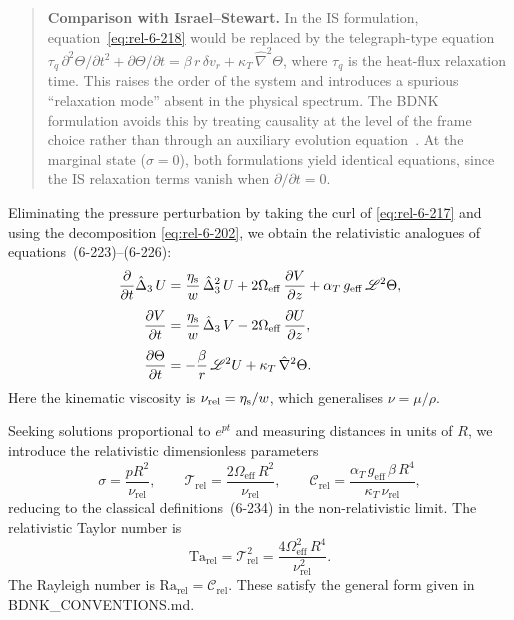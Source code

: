 \begin{quote}
\textbf{Comparison with Israel--Stewart.}
In the IS formulation, equation~\eqref{eq:rel-6-218} would be replaced
by the telegraph-type equation
$\tau_{q}\,\partial^{2}\Theta/\partial t^{2}
+ \partial\Theta/\partial t
= \beta\,r\,\delta v_{r} + \kappa_{T}\,\hat{\nabla}^{2}\Theta$,
where $\tau_{q}$ is the heat-flux relaxation time.  This raises the
order of the system and introduces a spurious ``relaxation mode''
absent in the physical spectrum.  The BDNK formulation avoids this
by treating causality at the level of the frame choice rather than
through an auxiliary evolution
equation~\cite{Kovtun2019,HoultKovtun2020}.
At the marginal state ($\sigma = 0$), both formulations yield
identical equations, since the IS relaxation terms vanish when
$\partial/\partial t = 0$.
\end{quote}

Eliminating the pressure perturbation by taking the curl of
\eqref{eq:rel-6-217} and using the decomposition
\eqref{eq:rel-6-202}, we obtain the relativistic analogues of
equations~(6-223)--(6-226):
\begin{align}
  \frac{\partial}{\partial t}\hat{\Delta}_{3}\,U
  &= \frac{\eta_{\mathrm{s}}}{w}\,\hat{\Delta}_{3}^{2}\,U
    + 2\Omega_{\mathrm{eff}}\,\frac{\partial V}{\partial z}
    + \alpha_{T}\,g_{\mathrm{eff}}\,\mathscr{L}^{2}\Theta,
  \label{eq:rel-6-223}\\[4pt]
  \frac{\partial V}{\partial t}
  &= \frac{\eta_{\mathrm{s}}}{w}\,\hat{\Delta}_{3}\,V
    - 2\Omega_{\mathrm{eff}}\,\frac{\partial U}{\partial z},
  \label{eq:rel-6-224}\\[4pt]
  \frac{\partial\Theta}{\partial t}
  &= -\frac{\beta}{r}\,\mathscr{L}^{2}U
    + \kappa_{T}\,\hat{\nabla}^{2}\Theta.
  \label{eq:rel-6-226}
\end{align}
Here the kinematic viscosity is
$\nu_{\mathrm{rel}} = \eta_{\mathrm{s}} / w$, which generalises $\nu = \mu/\rho$.

Seeking solutions proportional to $e^{pt}$ and measuring distances
in units of $R$, we introduce the relativistic dimensionless
parameters
\begin{equation}\label{eq:rel-6-234}
  \sigma = \frac{pR^{2}}{\nu_{\mathrm{rel}}},
  \qquad
  \mathscr{T}_{\mathrm{rel}}
  = \frac{2\Omega_{\mathrm{eff}}\,R^{2}}{\nu_{\mathrm{rel}}},
  \qquad
  \mathcal{C}_{\mathrm{rel}}
  = \frac{\alpha_{T}\,g_{\mathrm{eff}}\,\beta\,R^{4}}
         {\kappa_{T}\,\nu_{\mathrm{rel}}},
\end{equation}
reducing to the classical definitions~(6-234) in the
non-relativistic limit.  The relativistic Taylor number is
\begin{equation}\label{eq:rel-6-Ta}
  \mathrm{Ta}_{\mathrm{rel}}
  = \mathscr{T}_{\mathrm{rel}}^{2}
  = \frac{4\Omega_{\mathrm{eff}}^{2}\,R^{4}}
         {\nu_{\mathrm{rel}}^{2}}.
\end{equation}
The Rayleigh number is
$\mathrm{Ra}_{\mathrm{rel}} = \mathcal{C}_{\mathrm{rel}}$.
These satisfy the general form given in
BDNK\_CONVENTIONS.md.


